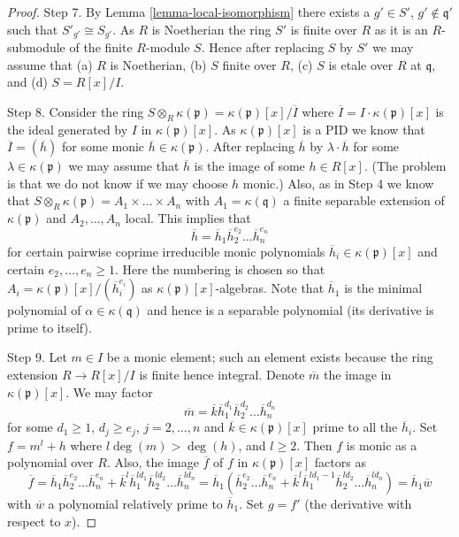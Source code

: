 \begin{proof}
\medskip\noindent
Step 7. By Lemma \ref{lemma-local-isomorphism} there exists a $g' \in S'$,
$g' \not \in \mathfrak q'$ such that $S'_{g'} \cong S_{g'}$.
As $R$ is Noetherian the ring $S'$ is finite over $R$ as it is an $R$-submodule
of the finite $R$-module $S$. Hence after replacing $S$ by $S'$ we may
assume that (a) $R$ is Noetherian, (b) $S$ finite over $R$, (c)
$S$ is etale over $R$ at $\mathfrak q$, and (d) $S = R[x]/I$.

\medskip\noindent
Step 8. Consider the ring
$S \otimes_R \kappa(\mathfrak p) = \kappa(\mathfrak p)[x]/\overline{I}$
where $\overline{I} = I \cdot \kappa(\mathfrak p)[x]$ is the ideal generated
by $I$ in $\kappa(\mathfrak p)[x]$. As $\kappa(\mathfrak p)[x]$ is a PID
we know that $\overline{I} = (\overline{h})$ for some monic
$\overline{h} \in \kappa(\mathfrak p)$. After replacing $\overline{h}$
by $\lambda \cdot \overline{h}$ for some $\lambda \in \kappa(\mathfrak p)$
we may assume that $\overline{h}$ is the image of some $h \in R[x]$.
(The problem is that we do not know if we may choose $h$ monic.)
Also, as in Step 4 we know that
$S \otimes_R \kappa(\mathfrak p) = A_1 \times \ldots \times A_n$ with
$A_1 = \kappa(\mathfrak q)$ a finite separable extension of
$\kappa(\mathfrak p)$ and $A_2, \ldots, A_n$ local. This implies
that
$$
\overline{h} = \overline{h}_1 \overline{h}_2^{e_2} \ldots \overline{h}_n^{e_n}
$$
for certain pairwise coprime irreducible monic polynomials
$\overline{h}_i \in \kappa(\mathfrak p)[x]$ and certain
$e_2, \ldots, e_n \geq 1$. Here the numbering is chosen so that
$A_i = \kappa(\mathfrak p)[x]/(\overline{h}_i^{e_i})$ as
$\kappa(\mathfrak p)[x]$-algebras. Note that $\overline{h}_1$ is
the minimal polynomial of $\alpha \in \kappa(\mathfrak q)$ and hence
is a separable polynomial (its derivative is prime to itself).

\medskip\noindent
Step 9. Let $m \in I$ be a monic element; such an element exists
because the ring extension $R \to R[x]/I$ is finite hence integral.
Denote $\overline{m}$ the image in $\kappa(\mathfrak p)[x]$.
We may factor
$$
\overline{m} = \overline{k}
\overline{h}_1^{d_1} \overline{h}_2^{d_2} \ldots \overline{h}_n^{d_n}
$$
for some $d_1 \geq 1$, $d_j \geq e_j$, $j = 2, \ldots, n$ and
$\overline{k} \in \kappa(\mathfrak p)[x]$ prime to all the $\overline{h}_i$.
Set $f = m^l + h$ where $l \deg(m) > \deg(h)$, and $l \geq 2$.
Then $f$ is monic as a polynomial over $R$. Also, the image $\overline{f}$
of $f$ in $\kappa(\mathfrak p)[x]$ factors as
$$
\overline{f} =
\overline{h}_1 \overline{h}_2^{e_2} \ldots \overline{h}_n^{e_n}
+
\overline{k}^l \overline{h}_1^{ld_1} \overline{h}_2^{ld_2}
\ldots \overline{h}_n^{ld_n}
=
\overline{h}_1(\overline{h}_2^{e_2} \ldots \overline{h}_n^{e_n}
+
\overline{k}^l
\overline{h}_1^{ld_1 - 1} \overline{h}_2^{ld_2} \ldots \overline{h}_n^{ld_n})
= \overline{h}_1 \overline{w}
$$
with $\overline{w}$ a polynomial relatively prime to $\overline{h}_1$.
Set $g = f'$ (the derivative with respect to $x$).


\end{proof}

